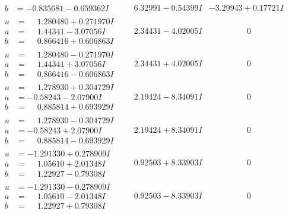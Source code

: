 \documentclass[1p]{elsarticle_modified}
\theoremstyle{definition}
\begin{document}
$$\begin{array}{c|c|c}
\begin{aligned}
b &= -0.835681 - 0.659362 I\end{aligned}
 & \phantom{-}6.32991 - 0.54399 I & -3.29943 + 0.17721 I \\ \hline\begin{aligned}
u &= \phantom{-}1.280480 + 0.271970 I \\
a &= \phantom{-}1.44341 - 3.07056 I \\
b &= \phantom{-}0.866416 + 0.606863 I\end{aligned}
 & \phantom{-}2.34431 - 4.02005 I & \phantom{-0.000000 } 0 \\ \hline\begin{aligned}
u &= \phantom{-}1.280480 - 0.271970 I \\
a &= \phantom{-}1.44341 + 3.07056 I \\
b &= \phantom{-}0.866416 - 0.606863 I\end{aligned}
 & \phantom{-}2.34431 + 4.02005 I & \phantom{-0.000000 } 0 \\ \hline\begin{aligned}
u &= \phantom{-}1.278930 + 0.304729 I \\
a &= -0.58243 - 2.07900 I \\
b &= \phantom{-}0.885814 + 0.693929 I\end{aligned}
 & \phantom{-}2.19424 - 8.34091 I & \phantom{-0.000000 } 0 \\ \hline\begin{aligned}
u &= \phantom{-}1.278930 - 0.304729 I \\
a &= -0.58243 + 2.07900 I \\
b &= \phantom{-}0.885814 - 0.693929 I\end{aligned}
 & \phantom{-}2.19424 + 8.34091 I & \phantom{-0.000000 } 0 \\ \hline\begin{aligned}
u &= -1.291330 + 0.278909 I \\
a &= \phantom{-}1.05610 + 2.01348 I \\
b &= \phantom{-}1.22927 - 0.79308 I\end{aligned}
 & \phantom{-}0.92503 + 8.33903 I & \phantom{-0.000000 } 0 \\ \hline\begin{aligned}
u &= -1.291330 - 0.278909 I \\
a &= \phantom{-}1.05610 - 2.01348 I \\
b &= \phantom{-}1.22927 + 0.79308 I\end{aligned}
 & \phantom{-}0.92503 - 8.33903 I & \phantom{-0.000000 } 0 \\ \hline\begin{aligned}

\end{aligned}
\end{array}$$
\end{document}
